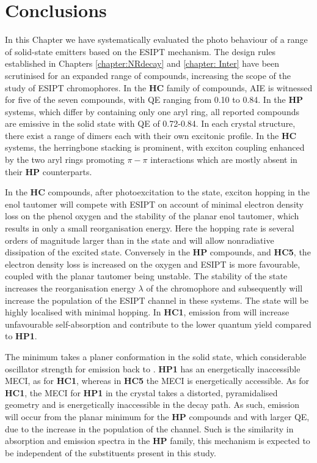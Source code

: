 \section{Conclusions}\label{section: Connecting_Conclusions}
In this Chapter we have systematically evaluated the photo behaviour of a range of solid-state emitters based on the ESIPT mechanism. The design rules established in Chapters \ref{chapter:NRdecay} and \ref{chapter: Inter} have been scrutinised for an expanded range of compounds, increasing the scope of the study of ESIPT chromophores. In the \textbf{HC} family of compounds, AIE is witnessed for five of the seven compounds, with \ac{QE} ranging from 0.10 to 0.84. In the \textbf{HP} systems, which differ by containing only one aryl ring, all reported compounds are emissive in the solid state with \ac{QE} of 0.72-0.84. In each crystal structure, there exist a range of dimers each with their own excitonic profile. In the \textbf{HC} systems, the herringbone stacking is prominent, with exciton coupling enhanced by the two aryl rings promoting $\pi-\pi$ interactions which are mostly absent in their \textbf{HP} counterparts.  

In the \textbf{HC} compounds, after photoexcitation to the \sone{} state, exciton hopping in the enol tautomer will compete with ESIPT on account of minimal electron density loss on the phenol oxygen and the stability of the planar enol tautomer, which results in only a small reorganisation energy. Here the hopping rate is several orders of magnitude larger than in the \Kstar{} state and will allow nonradiative dissipation of the excited state. Conversely in the \textbf{HP} compounds, and \textbf{HC5}, the electron density loss is increased on the oxygen and ESIPT is more favourable, coupled with the planar \Estar{} tautomer being unstable. The stability of the \Kstar{} state increases the reorganisation energy $\lambda$ of the chromophore and subsequently will increase the population of the ESIPT channel in these systems. The \Kstar{} state will be highly localised with minimal hopping. In \textbf{HC1}, emission from \Estar{} will increase unfavourable self-absorption and contribute to the lower quantum yield compared to \textbf{HP1}.

The \Kstar{} minimum takes a planer conformation in the solid state, which considerable oscillator strength for emission back to \szero{}. \textbf{HP1} has an energetically inaccessible MECI, as for \textbf{HC1}, whereas in \textbf{HC5} the MECI is energetically accessible. As for \textbf{HC1}, the MECI for \textbf{HP1} in the crystal takes a distorted, pyramidalised geometry and is energetically inaccessible in the decay path. As such, emission will occur from the planar \Kstar{} minimum for the \textbf{HP} compounds and with larger \ac{QE}, due to the increase in the population of the \Kstar{} channel. Such is the similarity in absorption and emission spectra in the \textbf{HP} family, this mechanism is expected to be independent of the substituents present in this study. 

